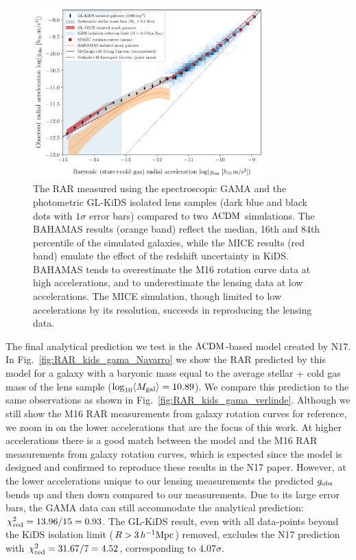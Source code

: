 \documentclass[usenatbib]{mnras}
\newcommand{\hMpc}{\, h^{-1}{\rm{Mpc}} }
\newcommand{\lcdm}{{\rm \Lambda CDM}}
\newcommand*{\meanb}[1]{\langle{#1}\rangle}
\newcommand{\un}[1]{_{\rm #1}}
\begin{document}
\begin{figure}
	\includegraphics[width=0.8\textwidth]{Figures/RAR_KiDS+MICE+Bahamas+Verlinde_No_Nobins_isolated_zoomout.pdf}
	\caption{The RAR measured using the spectroscopic GAMA and the photometric GL-KiDS isolated lens samples (dark blue and black dots with $1\sigma$ error bars) compared to two $\lcdm$ simulations. The BAHAMAS results (orange band) reflect the median, 16th and 84th percentile of the simulated galaxies, while the MICE results (red band) emulate the effect of the redshift uncertainty in KiDS. BAHAMAS tends to overestimate the M16 rotation curve data at high accelerations, and to underestimate the lensing data at low accelerations. The MICE simulation, though limited to low accelerations by its resolution, succeeds in reproducing the lensing data.}
	\label{fig:RAR_kids_mice_bahamas}
\end{figure}

The final analytical prediction we test is the $\lcdm$-based model created by N17. In Fig.~\ref{fig:RAR_kids_gama_Navarro} we show the RAR predicted by this model for a galaxy with a baryonic mass equal to the average stellar + cold gas mass of the lens sample ($\log_{10}\meanb{M\un{gal}} = 10.89$). We compare this prediction to the same observations as shown in Fig.~\ref{fig:RAR_kids_gama_verlinde}. Although we still show the M16 RAR measurements from galaxy rotation curves for reference, we zoom in on the lower accelerations that are the focus of this work. At higher accelerations there is a good match between the model and the M16 RAR measurements from galaxy rotation curves, which is expected since the model is designed and confirmed to reproduce these results in the N17 paper. However, at the lower accelerations unique to our lensing measurements the predicted $g\un{obs}$ bends up and then down compared to our measurements. Due to its large error bars, the GAMA data can still accommodate the analytical prediction: $\chi\un{red}^2 = 13.96 / 15 = 0.93$. The GL-KiDS result, even with all data-points beyond the KiDS isolation limit ($R>3 \hMpc$) removed, excludes the N17 prediction with $\chi\un{red}^2 = 31.67 / 7 = 4.52$, corresponding to $4.07 \sigma$.
\end{document}
